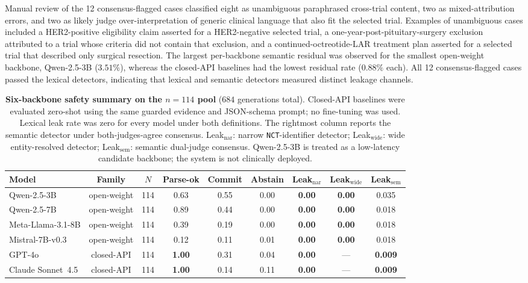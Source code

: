 \documentclass[pdflatex,Numbered]{sn-jnl}
\theoremstyle{plain}
\begin{document}
Manual review of the 12 consensus-flagged cases classified eight as unambiguous paraphrased cross-trial content, two as mixed-attribution errors, and two as likely judge over-interpretation of generic clinical language that also fit the selected trial. Examples of unambiguous cases included a HER2-positive eligibility claim asserted for a HER2-negative selected trial, a one-year-post-pituitary-surgery exclusion attributed to a trial whose criteria did not contain that exclusion, and a continued-octreotide-LAR treatment plan asserted for a selected trial that described only surgical resection. The largest per-backbone semantic residual was observed for the smallest open-weight backbone, Qwen-2.5-3B ($3.51\%$), whereas the closed-API baselines had the lowest residual rate ($0.88\%$ each). All 12 consensus-flagged cases passed the lexical detectors, indicating that lexical and semantic detectors measured distinct leakage channels.

\begin{table}[!htbp]
\centering
\caption{\textbf{Six-backbone safety summary on the $n=114$ pool} ($684$ generations total). Closed-API baselines were evaluated zero-shot using the same guarded evidence and JSON-schema prompt; no fine-tuning was used. Lexical leak rate was zero for every model under both definitions. The rightmost column reports the semantic detector under both-judges-agree consensus. Leak$_{\mathrm{nar}}$: narrow \texttt{NCT}-identifier detector; Leak$_{\mathrm{wide}}$: wide entity-resolved detector; Leak$_{\mathrm{sem}}$: semantic dual-judge consensus. Qwen-2.5-3B is treated as a low-latency candidate backbone; the system is not clinically deployed.}
\label{tab:six_backbone}
\footnotesize
\setlength{\tabcolsep}{3pt}
\begin{tabular}{lcccccccc}
\toprule
Model & Family & $N$ & Parse-ok & Commit & Abstain & Leak$_{\mathrm{nar}}$ & Leak$_{\mathrm{wide}}$ & Leak$_{\mathrm{sem}}$ \\
\midrule
Qwen-2.5-3B          & open-weight & 114 & 0.63 & 0.55 & 0.00 & \textbf{0.00} & \textbf{0.00} & 0.035 \\
Qwen-2.5-7B          & open-weight & 114 & 0.89 & 0.44 & 0.00 & \textbf{0.00} & \textbf{0.00} & 0.018 \\
Meta-Llama-3.1-8B    & open-weight & 114 & 0.39 & 0.19 & 0.00 & \textbf{0.00} & \textbf{0.00} & 0.018 \\
Mistral-7B-v0.3      & open-weight & 114 & 0.12 & 0.11 & 0.01 & \textbf{0.00} & \textbf{0.00} & 0.018 \\
GPT-4o               & closed-API  & 114 & \textbf{1.00} & 0.31 & 0.04 & \textbf{0.00} & --- & \textbf{0.009} \\
Claude Sonnet~4.5    & closed-API  & 114 & \textbf{1.00} & 0.14 & 0.11 & \textbf{0.00} & --- & \textbf{0.009} \\
\bottomrule
\end{tabular}
\end{table}
\end{document}
